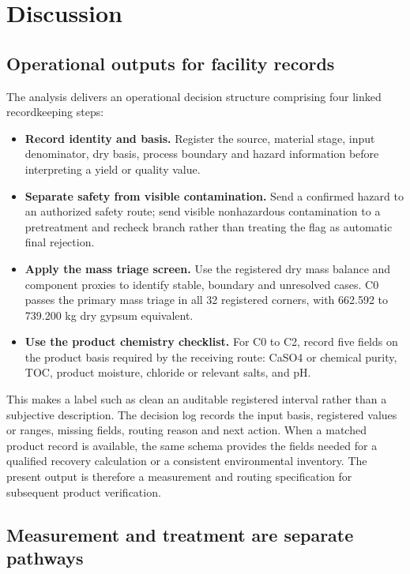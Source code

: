 \documentclass[pdflatex,sn-basic]{sn-jnl}
\begin{document}
\section{Discussion}\label{discussion}

\subsection{Operational outputs for facility records}\label{operational-outputs-for-facility-records}

The analysis delivers an operational decision structure comprising four linked recordkeeping steps:

\begin{itemize}

\item
  \textbf{Record identity and basis.} Register the source, material stage, input denominator, dry basis, process boundary and hazard information before interpreting a yield or quality value.
\item
  \textbf{Separate safety from visible contamination.} Send a confirmed hazard to an authorized safety route; send visible nonhazardous contamination to a pretreatment and recheck branch rather than treating the flag as automatic final rejection.
\item
  \textbf{Apply the mass triage screen.} Use the registered dry mass balance and component proxies to identify stable, boundary and unresolved cases. C0 passes the primary mass triage in all 32 registered corners, with 662.592 to 739.200 kg dry gypsum equivalent.
\item
  \textbf{Use the product chemistry checklist.} For C0 to C2, record five fields on the product basis required by the receiving route: CaSO4 or chemical purity, TOC, product moisture, chloride or relevant salts, and pH.
\end{itemize}

This makes a label such as clean an auditable registered interval rather than a subjective description. The decision log records the input basis, registered values or ranges, missing fields, routing reason and next action. When a matched product record is available, the same schema provides the fields needed for a qualified recovery calculation or a consistent environmental inventory. The present output is therefore a measurement and routing specification for subsequent product verification.

\subsection{Measurement and treatment are separate pathways}\label{measurement-and-treatment-are-separate-pathways}
\end{document}
